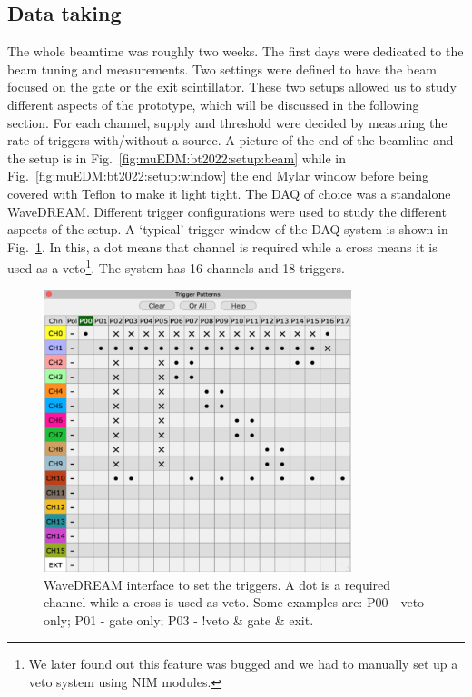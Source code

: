\begin{refsection}
    \subsection{Data taking}
        The whole beamtime was roughly two weeks. 
        The first days were dedicated to the beam tuning and measurements.
        Two settings were defined to have the beam focused on the gate or the exit scintillator. 
        These two setups allowed us to study different aspects of the prototype, which will be discussed in the following section.
        For each channel, supply and threshold were decided by measuring the rate of triggers with/without a  source. 
        A picture of the end of the beamline and the setup is in Fig.~\ref{fig:muEDM:bt2022:setup:beam} while in  Fig.~\ref{fig:muEDM:bt2022:setup:window} the end Mylar window before being covered with Teflon to make it light tight.
        The DAQ of choice was a standalone WaveDREAM.
        Different trigger configurations were used to study the different aspects of the setup. 
        A `typical' trigger window of the DAQ system is shown in Fig.~\ref{fig:muEDM:bt2022:triggers}.
        In this, a dot means that channel is required while a cross means it is used as a veto\footnote{We later found out this feature was bugged and we had to manually set up a veto system using NIM modules.}.
        The system has 16 channels and 18 triggers.
        
        \begin{figure}
            \centering
            \includegraphics[width = 0.8\textwidth]{Figures/muEDM_Nov2022/muEDM2022_triggers.png}
            \caption[muEDM:2022 triggers]{WaveDREAM interface to set the triggers. A dot is a required channel while a cross is used as veto. Some examples are: P00 - veto only; P01 - gate only; P03 - !veto \& gate \& exit.}
            \label{fig:muEDM:bt2022:triggers}
        \end{figure}
        

\end{refsection}
